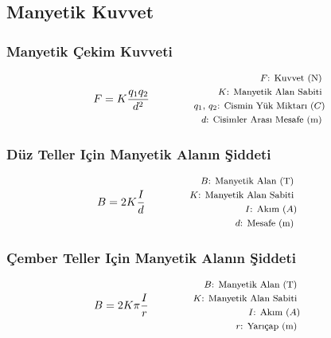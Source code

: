 \subsection{Manyetik Kuvvet}

\subsubsection*{Manyetik Çekim Kuvveti}
\begin{equation}
    F = K\frac{q_1 q_2}{d^2} \qquad \qquad \parbox{4cm}{\footnotesize$\begin{aligned}
        F\text{: Kuvvet (N) } \\
        K\text{: Manyetik Alan Sabiti } \\
        q_1\text{, }q_2\text{: Cismin Yük Miktarı } (C) \\
        d\text{: Cisimler Arası Mesafe (m) }
\end{aligned}$}
\end{equation}

\subsubsection*{Düz Teller Için Manyetik Alanın Şiddeti}
\begin{equation}
    B = 2 K \frac{I}{d} \qquad \qquad \parbox{4cm}{\footnotesize$\begin{aligned}
        B\text{: Manyetik Alan (T) } \\
        K\text{: Manyetik Alan Sabiti } \\
        I\text{: Akım } (A) \\
        d\text{: Mesafe (m) }
\end{aligned}$}
\end{equation}

\subsubsection*{Çember Teller Için Manyetik Alanın Şiddeti}
\begin{equation}
    B = 2 K \pi \frac{I}{r} \qquad \qquad \parbox{4cm}{\footnotesize$\begin{aligned}
        B\text{: Manyetik Alan (T) } \\
        K\text{: Manyetik Alan Sabiti } \\
        I\text{: Akım } (A) \\
        r\text{: Yarıçap (m) }
\end{aligned}$}
\end{equation}

